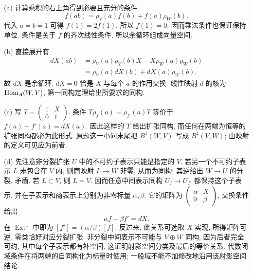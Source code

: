 \begin{solution}
(a) 计算乘积的右上角得到必要且充分的条件
\[
 f(ab)=\rho_V(a)f(b)+f(a)\rho_W(b).                 \tag{H5.1}
\]
代入 $a=b=1$ 可得 $f(1)=2f(1)$, 所以 $f(1)=0$. 因而乘法条件也保证保持单位. 条件是关于 $f$ 的齐次线性条件, 所以余循环组成向量空间.

(b) 直接展开有
\[
\begin{aligned}
 dX(ab)&=\rho_V(a)\rho_V(b)X-X\rho_W(a)\rho_W(b)\\
 &=\rho_V(a)dX(b)+dX(a)\rho_W(b).
\end{aligned}
\]
故 $dX$ 是余循环. $dX=0$ 恰是 $X$ 与每个 $a$ 的作用交换. 线性映射 $d$ 的核为 $\operatorname{Hom}_A(W,V)$, 第一同构定理给出所要求的同构.

(c) 写 $T=\begin{pmatrix}1&X\\0&1\end{pmatrix}$. 条件 $T\rho_f(a)=\rho_{f'}(a)T$ 等价于 $f(a)-f'(a)=dX(a)$. 因此这样的 $T$ 给出扩张同构, 而任何在两端为恒等的扩张同构都必为此形式. 原题这一小问末尾把 $B^1(W,V)$ 写成 $B^1(V,W)$; 由映射的定义可见应为前者.

(d) 先注意非分裂扩张 $U$ 中的不可约子表示只能是指定的 $V$. 若另一个不可约子表示 $L$ 未包含在 $V$ 内, 则商映射 $L\to W$ 非零, 从而为同构; 其逆给出 $W\to U$ 的分裂, 矛盾. 若 $L\subset V$, 则 $L=V$. 因而任意中间表示同构 $U_f\to U_{f'}$ 都保持这个子表示, 并在子表示和商表示上分别为非零标量 $\alpha,\beta$. 它的矩阵为 $\begin{pmatrix}\alpha&X\\0&\beta\end{pmatrix}$, 交换条件给出
\[
 \alpha f-\beta f'=dX.
\]
在 $\operatorname{Ext}^1$ 中即为 $[f']=(\alpha/\beta)[f]$. 反过来, 此关系可选取 $X$ 实现, 所得矩阵可逆. 零类恰好对应分裂扩张. 非分裂中间表示不可能与 $V\oplus W$ 同构, 因为后者完全可约, 其中每个子表示都有补空间. 这证明射影空间分类及最后的等价关系. 代数闭域条件在将两端的自同构化为标量时使用; 一般域不能不加修改地沿用该射影空间结论.
\end{solution}

